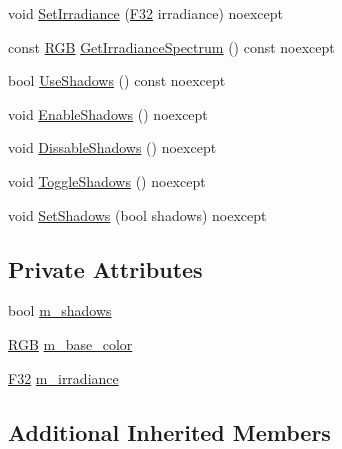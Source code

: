 \begin{DoxyCompactItemize}
void \mbox{\hyperlink{classmage_1_1rendering_1_1_directional_light_af8570b18bfb807492317e4a98f5c7ba6}{Set\+Irradiance}} (\mbox{\hyperlink{namespacemage_aa97e833b45f06d60a0a9c4fc22ae02c0}{F32}} irradiance) noexcept
\item 
const \mbox{\hyperlink{structmage_1_1_r_g_b}{R\+GB}} \mbox{\hyperlink{classmage_1_1rendering_1_1_directional_light_a3a99d3d63a686f8bc587015115a85a81}{Get\+Irradiance\+Spectrum}} () const noexcept
\item 
bool \mbox{\hyperlink{classmage_1_1rendering_1_1_directional_light_a129904147256d111ec56cc3ddc502157}{Use\+Shadows}} () const noexcept
\item 
void \mbox{\hyperlink{classmage_1_1rendering_1_1_directional_light_abafdec9ce9ca0263724ce8ddba430b1b}{Enable\+Shadows}} () noexcept
\item 
void \mbox{\hyperlink{classmage_1_1rendering_1_1_directional_light_a7b0b25df35d2c1121bf08cb0a733b858}{Dissable\+Shadows}} () noexcept
\item 
void \mbox{\hyperlink{classmage_1_1rendering_1_1_directional_light_a34a939e192e857ac25f6d91dd773ec9b}{Toggle\+Shadows}} () noexcept
\item 
void \mbox{\hyperlink{classmage_1_1rendering_1_1_directional_light_a4a8aa135c9366993f6343b33cd4ed9e0}{Set\+Shadows}} (bool shadows) noexcept
\end{DoxyCompactItemize}
\subsection*{Private Attributes}
\begin{DoxyCompactItemize}
\item 
bool \mbox{\hyperlink{classmage_1_1rendering_1_1_directional_light_a64fa40ef9f9d0ae8a0856aabd44f0cae}{m\+\_\+shadows}}
\item 
\mbox{\hyperlink{structmage_1_1_r_g_b}{R\+GB}} \mbox{\hyperlink{classmage_1_1rendering_1_1_directional_light_a55d415fffd8f59f296e4d380639d3af1}{m\+\_\+base\+\_\+color}}
\item 
\mbox{\hyperlink{namespacemage_aa97e833b45f06d60a0a9c4fc22ae02c0}{F32}} \mbox{\hyperlink{classmage_1_1rendering_1_1_directional_light_a72b58bf80a9f40934622aee9f68aa545}{m\+\_\+irradiance}}
\end{DoxyCompactItemize}
\subsection*{Additional Inherited Members}


